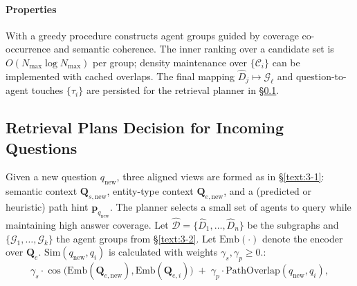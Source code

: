 \documentclass[sigconf]{acmart}
\begin{document}
\paragraph{Properties} With a greedy procedure constructs agent groups guided by coverage co-occurrence and semantic coherence.
The inner ranking over a candidate set is \(O(N_{\max}\log N_{\max})\) per group; density maintenance over \(\{\mathcal{C}_i\}\) can be implemented with cached overlaps. The final mapping \(\hat{D}_j \mapsto \mathcal{G}_\ell\) and question-to-agent
touches \(\{\tau_i\}\) are persisted for the retrieval planner in \S\ref{text:3-3}.

\subsection{Retrieval Plans Decision for Incoming Questions} \label{text:3-3}

Given a new question \(q_{\text{new}}\), three aligned views are formed as in \S\ref{text:3-1}:
semantic context \(\mathbf{Q}_{s,\text{new}}\), entity-type context \(\mathbf{Q}_{e,\text{new}}\), and a (predicted or heuristic) path hint \(\mathbf{p}_{q_{\text{new}}}\).
The planner selects a small set of agents to query while maintaining high answer coverage. Let \(\hat{\mathcal{D}}=\{\hat{D}_1,\ldots,\hat{D}_n\}\) be the subgraphs and
\(\{\mathcal{G}_1,\ldots,\mathcal{G}_k\}\) the agent groups from \S\ref{text:3-2}. Let \(\text{Emb}(\cdot)\) denote the encoder over \(\mathbf{Q}_e\).
$\text{Sim}(q_{\text{new}}, q_i)$ is calculated with weights \(\gamma_s,\gamma_p \ge 0\).:
\begin{equation}
\label{eq:sim-score}
\gamma_s \cdot \cos\!\bigl(\text{Emb}(\mathbf{Q}_{e,\text{new}}), \text{Emb}(\mathbf{Q}_{e,i})\bigr)
\;+\;
\gamma_p \cdot \text{PathOverlap}(q_{\text{new}}, q_i),
\end{equation}
\end{document}
